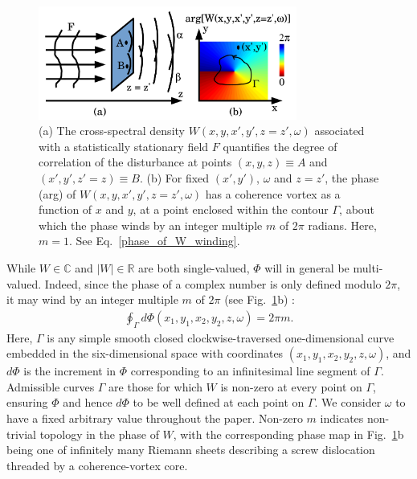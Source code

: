 \documentclass[%
 reprint,
 amsmath,amssymb,
 aps,
]{revtex4-1}
\begin{document}
\begin{figure}
\includegraphics[width=8.5cm]{Figures/coherence_vortex.png}
\caption{(a) The cross-spectral density $W(x,y,x',y',z=z',\omega)$ associated with a statistically stationary field $F$ quantifies the degree of correlation of the disturbance at points $(x,y,z)\equiv A$ and $(x',y',z'=z)\equiv B$. (b) For fixed $(x',y')$, $\omega$ and $z=z'$, the phase (arg) of $W(x,y,x',y',z=z',\omega)$ has a coherence vortex as a function of $x$ and $y$, at a point enclosed within the contour $\Gamma$, about which the phase winds by an integer multiple $m$ of $2\pi$ radians. Here, $m=1$.  See Eq.~\ref{phase_of_W_winding}.}
\label{loss_of_fringe_visibility}
\end{figure}

While $W\in\mathbb{C}$ and $|W|\in\mathbb{R}$ are both single-valued, $\Phi$ will in general be multi-valued. Indeed, since the phase of a complex number is only defined modulo $2\pi$, it may wind by an integer multiple $m$ of $2\pi$ (see Fig.~\ref{loss_of_fringe_visibility}b) \cite{GburVisser2003,Marasinghe2011}: 
\begin{equation}
\begin{aligned}
\label{phase_of_W_winding}
\oint_{\Gamma} d\Phi(x_1,y_1,x_2,y_2,z,\omega)=2\pi m.
\end{aligned}
\end{equation}
Here, $\Gamma$ is any simple smooth closed clockwise-traversed one-dimensional curve embedded in the six-dimensional space with coordinates $(x_1,y_1,x_2,y_2,z,\omega)$, and $d\Phi$ is the increment in $\Phi$ corresponding to an infinitesimal line segment of $\Gamma$.  Admissible curves $\Gamma$ are those for which $W$ is non-zero at every point on $\Gamma$, ensuring $\Phi$ and hence $d\Phi$ to be well defined at each point on $\Gamma$.  We consider $\omega$ to have a fixed arbitrary value throughout the paper. Non-zero $m$ indicates non-trivial topology in the phase of $W$, with the corresponding phase map in Fig.~\ref{loss_of_fringe_visibility}b being one of infinitely many Riemann sheets describing a screw dislocation threaded by a coherence-vortex core. 
\end{document}
